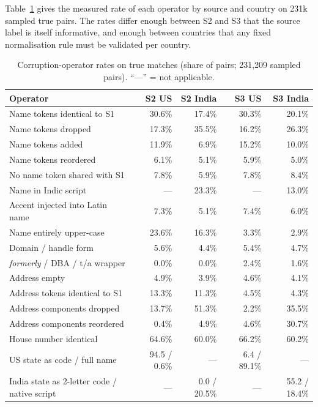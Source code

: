 \documentclass[10pt]{article}
\begin{document}
Table~\ref{tab:ops} gives the measured rate of each operator by source and country on 231k sampled true pairs. The rates differ enough between S2 and S3 that the source label is itself informative, and enough between countries that any fixed normalisation rule must be validated per country.

\begin{table}[htbp]
\centering\small
\caption{Corruption-operator rates on true matches (share of pairs; 231,209 sampled pairs). ``---'' = not applicable.}
\label{tab:ops}
\begin{tabular}{@{}lrrrr@{}}
\toprule
Operator & S2 US & S2 India & S3 US & S3 India \\
\midrule
Name tokens identical to S1 & 30.6\% & 17.4\% & 30.3\% & 20.1\% \\
Name tokens dropped & 17.3\% & 35.5\% & 16.2\% & 26.3\% \\
Name tokens added & 11.9\% & 6.9\% & 15.2\% & 10.0\% \\
Name tokens reordered & 6.1\% & 5.1\% & 5.9\% & 5.0\% \\
No name token shared with S1 & 7.8\% & 5.9\% & 7.8\% & 8.4\% \\
Name in Indic script & --- & 23.3\% & --- & 13.0\% \\
Accent injected into Latin name & 7.3\% & 5.1\% & 7.4\% & 6.0\% \\
Name entirely upper-case & 23.6\% & 16.3\% & 3.3\% & 2.9\% \\
Domain / handle form & 5.6\% & 4.4\% & 5.4\% & 4.7\% \\
\emph{formerly} / DBA / t/a wrapper & 0.0\% & 0.0\% & 2.4\% & 1.6\% \\
Address empty & 4.9\% & 3.9\% & 4.6\% & 4.1\% \\
Address tokens identical to S1 & 13.3\% & 11.3\% & 4.5\% & 4.3\% \\
Address components dropped & 13.7\% & 51.3\% & 2.2\% & 35.5\% \\
Address components reordered & 0.4\% & 4.9\% & 4.6\% & 30.7\% \\
House number identical & 64.6\% & 60.0\% & 66.2\% & 60.2\% \\
US state as code / full name & 94.5 / 0.6\% & --- & 6.4 / 89.1\% & --- \\
India state as 2-letter code / native script & --- & 0.0 / 20.5\% & --- & 55.2 / 18.4\% \\
\bottomrule
\end{tabular}
\end{table}
\end{document}
